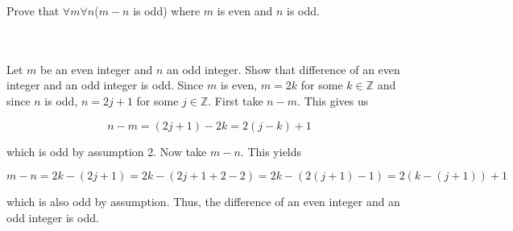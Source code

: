 Prove that $\forall m\forall n$($m-n$ is odd) where $m$ is even and $n$ is odd.\\\\

\begin{solution}\renewcommand{\qedsymbol}{}\ \\
    Let $m$ be an even integer and $n$ an odd integer. Show that difference of an even integer and an
    odd integer is odd. Since $m$ is even, $m=2k$ for some $k\in \mathbb{Z}$ and since $n$ is odd,
    $n=2j+1$ for some $j\in \mathbb{Z}$. First take $n-m$. This gives us
    
    $$n-m=(2j+1)-2k=2(j-k)+1$$
    
    which is odd by assumption 2. Now take $m-n$. This yields
    
    $$m-n=2k-(2j+1)=2k-(2j+1+2-2)=2k-(2(j+1)-1)=2(k-(j+1))+1$$
    
    which is also odd by assumption. Thus, the difference of an even integer and an odd integer is odd.

\end{solution}